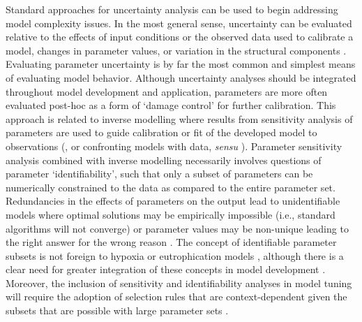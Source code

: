 \documentclass[letterpaper,12pt,oneside]{article}\usepackage[]{graphicx}\usepackage[]{color}
\begin{document}
Standard approaches for uncertainty analysis can be used to begin addressing model complexity issues.  In the most general sense, uncertainty can be evaluated relative to the effects of input conditions or the observed data used to calibrate a model, changes in parameter values, or variation in the structural components \citep{Beck87}.  Evaluating parameter uncertainty is by far the most common and simplest means of evaluating model behavior.  Although uncertainty analyses should be integrated throughout model development and application, parameters are more often evaluated post-hoc as a form of `damage control' for further calibration.  This approach is related to inverse modelling where results from sensitivity analysis of parameters are used to guide calibration or fit of the developed model to observations (\citealt{Soetaert10}, or confronting models with data, \textit{sensu} \citealt{Hilborn97}).  Parameter sensitivity analysis combined with inverse modelling necessarily involves questions of parameter `identifiability', such that only a subset of parameters can be numerically constrained to the data as compared to the entire parameter set.  Redundancies in the effects of parameters on the output lead to unidentifiable models where optimal solutions may be empirically impossible (i.e., standard algorithms will not converge) or parameter values may be non-unique leading to the right answer for the wrong reason \citep{Kirchner06}.  The concept of identifiable parameter subsets is not foreign to hypoxia or eutrophication models  \citep{Omlin01,Estrada10,Mateus15}, although there is a clear need for greater integration of these concepts in model development \citep{Fasham06}.  Moreover, the inclusion of sensitivity and identifiability analyses in model tuning will require the adoption of selection rules that are context-dependent given the subsets that are possible with large parameter sets \citep[e.g.,][]{Wagener01, Wagener01b}.  
\end{document}
